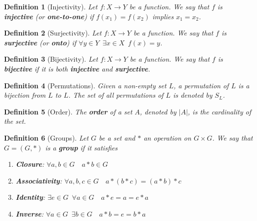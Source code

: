 \documentclass[9pt,landscape,a4paper]{article}
\newcommand{\abs}[1]{\left|#1\right|}           %
\newcommand{\hldefn}[1]{\textcolor{base16-eighties-magenta}{\textbf{#1}}}
\newcommand{\hlnoteb}[1]{\textcolor{base16-eighties-magenta}{\textbf{#1}}}
\theoremstyle{empty}
\newtheorem{defn}{Definition}
\begin{document}
\small
\begin{multicols*}{5}

\begin{defn}[Injectivity]\label{defn:injectivity}
  Let $f: X \to Y$ be a function. We say that $f$ is \hlnoteb{injective} (or \hldefn{one-to-one}) if $f(x_1) = f(x_2)$ implies $x_1 = x_2$.
\end{defn}

\begin{defn}[Surjectivity]\label{defn:surjectivity}
  Let $f: X \to Y$ be a function. We say that $f$ is \hlnoteb{surjective} (or \hldefn{onto}) if $\forall y \in Y \enspace \exists x \in X \enspace f(x) = y$.
\end{defn}

\begin{defn}[Bijectivity]\label{defn:bijectivity}
  Let $f: X \to Y$ be a function. We say that $f$ is \hlnoteb{bijective} if it is both \hlnoteb{injective} and \hlnoteb{surjective}.
\end{defn}

\begin{defn}[Permutations]\label{defn:permutations}
  Given a non-empty set $L$, a permutation of $L$ is a bijection from $L$ to $L$. The set of all permutations of $L$ is denoted by $S_L$.
\end{defn}

\begin{defn}[Order]\label{defn:order}
  The \hlnoteb{order} of a set $A$, denoted by $\abs{A}$, is the cardinality of the set.
\end{defn}

\begin{defn}[Groups]\label{defn:groups}
  Let $G$ be a set and $*$ an operation on $G \times G$. We say that $G = (G, *)$ is a \hlnoteb{group} if it satisfies
  \begin{enumerate}
    \item \hlnoteb{Closure}: $\forall a, b \in G \quad a * b \in G$
    \item \hlnoteb{Associativity}: $\forall a, b, c \in G \quad a * (b * c) = (a * b) * c$
    \item \hlnoteb{Identity}: $\exists e \in G \enspace \forall a \in G \quad a * e = a = e * a$
    \item \hlnoteb{Inverse}: $\forall a \in G \enspace \exists b \in G \quad a * b = e = b * a$
  \end{enumerate}
\end{defn}


\end{multicols*}
\end{document}
